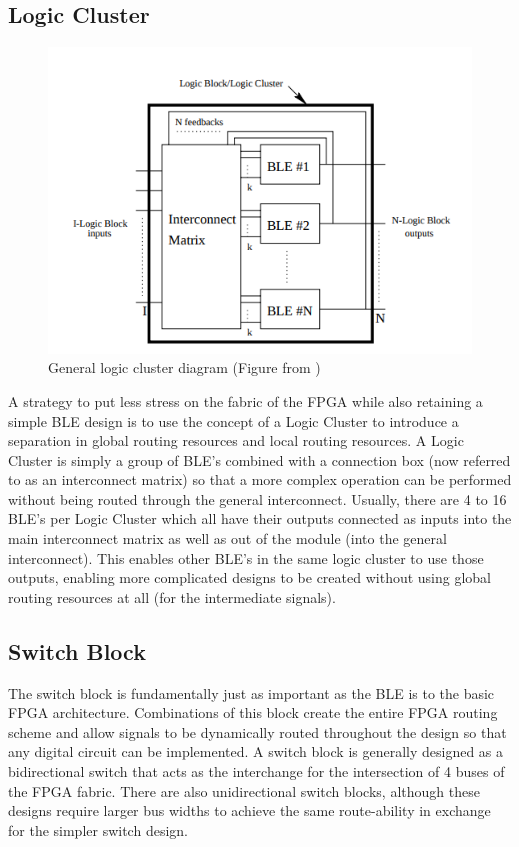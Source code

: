 \documentclass[12pt]{article}
\begin{document}
\subsection{Logic Cluster} \label{logicCluster}

\begin{figure}[ht]
  \centering
  \includegraphics[width=.7\textwidth]{logicclusterex}
  \caption{General logic cluster diagram (Figure from \cite{masud_1999})}
  \label{fig:logiccluster_ex}
\end{figure}

A strategy to put less stress on the fabric of the FPGA while also retaining a simple 
BLE design is to use the concept of a Logic Cluster to introduce a separation in 
global routing resources and local routing resources. A Logic Cluster is simply a 
group of BLE’s combined with a connection box (now referred to as an interconnect matrix)
so that a more complex operation 
can be performed without being routed through the general interconnect. Usually, 
there are 4 to 16 BLE’s per Logic Cluster which all have their outputs connected 
as inputs into the main interconnect matrix as well as out of the module (into the 
general interconnect). This enables other BLE’s in the same logic cluster to use 
those outputs, enabling more complicated designs to be created without using global 
routing resources at all (for the intermediate signals).

\subsection{Switch Block}
The switch block is fundamentally just as important as the BLE is to the basic FPGA 
architecture. Combinations of this block create the entire FPGA routing scheme and 
allow signals to be dynamically routed throughout the design so that any digital 
circuit can be implemented. A switch block is generally designed as a bidirectional 
switch that acts as the interchange for the intersection of 4 buses of the FPGA fabric.
There are also unidirectional switch blocks, although these designs require larger 
bus widths to achieve the same route-ability in exchange for the simpler switch design.
\end{document}
